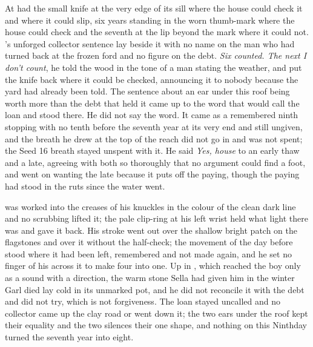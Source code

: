 At   had the small knife at the very edge of its sill where the house could check it and where it could slip, six years standing in the worn thumb-mark where the house could check and the seventh at the lip beyond the mark where it could not. 's unforged collector sentence lay beside it with no name on the man who had turned back at the frozen ford and no figure on the debt. \emph{Six counted. The next I don't count}, he told the wood in the tone of a man stating the weather, and put the knife back where it could be checked, announcing it to nobody because the yard had already been told. The sentence about an ear under this roof being worth more than the debt that held it came up to the word that would call the loan and stood there. He did not say the word. It came as a remembered ninth stopping with no tenth before the seventh year at its very end and still ungiven, and the breath he drew at the top of the reach did not go in and was not spent; the Seed 16 breath stayed unspent with it. He said \emph{Yes, house} to an early thaw and a late, agreeing with both so thoroughly that no argument could find a foot, and went on wanting the late because it puts off the paying, though the paying had stood in the ruts since the water went.

 was worked into the creases of his knuckles in the colour of the clean dark line and no scrubbing lifted it; the pale clip-ring at his left wrist held what light there was and gave it back. His stroke went out over the shallow bright patch on the flagstones and over it without the half-check; the movement of the day before stood where it had been left, remembered and not made again, and he set no finger of his across it to make four into one. Up in , which reached the boy only as a sound with a direction, the warm stone Sella had given him in the winter Garl died lay cold in its unmarked pot, and he did not reconcile it with the debt and did not try, which is not forgiveness. The loan stayed uncalled and no collector came up the clay road or went down it; the two ears under the roof kept their equality and the two silences their one shape, and nothing on this Ninthday turned the seventh year into eight.

